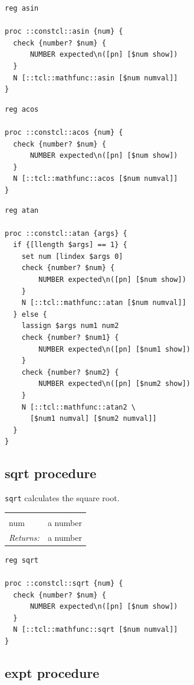 \documentclass[twoside,9pt]{report}
\begin{document}
\begin{lstlisting}
reg asin

proc ::constcl::asin {num} {
  check {number? $num} {
      NUMBER expected\n([pn] [$num show])
  }
  N [::tcl::mathfunc::asin [$num numval]]
}
\end{lstlisting}
\begin{lstlisting}
reg acos

proc ::constcl::acos {num} {
  check {number? $num} {
      NUMBER expected\n([pn] [$num show])
  }
  N [::tcl::mathfunc::acos [$num numval]]
}
\end{lstlisting}
\begin{lstlisting}
reg atan

proc ::constcl::atan {args} {
  if {[llength $args] == 1} {
    set num [lindex $args 0]
    check {number? $num} {
        NUMBER expected\n([pn] [$num show])
    }
    N [::tcl::mathfunc::atan [$num numval]]
  } else {
    lassign $args num1 num2
    check {number? $num1} {
        NUMBER expected\n([pn] [$num1 show])
    }
    check {number? $num2} {
        NUMBER expected\n([pn] [$num2 show])
    }
    N [::tcl::mathfunc::atan2 \
      [$num1 numval] [$num2 numval]]
  }
}
\end{lstlisting}
\subsection{sqrt procedure}
\label{sqrt-procedure}


\texttt{sqrt} calculates the square root.

\noindent\begin{tabular}{ |p{1.9cm} p{8cm}| }
\hline
\rowcolor[HTML]{CCCCCC} \multicolumn{2}{|l|}{\bf sqrt (public)} \\
num & a number \\
\textit{Returns:} & a number \\
\hline
\end{tabular}
\begin{lstlisting}
reg sqrt

proc ::constcl::sqrt {num} {
  check {number? $num} {
      NUMBER expected\n([pn] [$num show])
  }
  N [::tcl::mathfunc::sqrt [$num numval]]
}
\end{lstlisting}
\subsection{expt procedure}
\label{expt-procedure}
\end{document}
